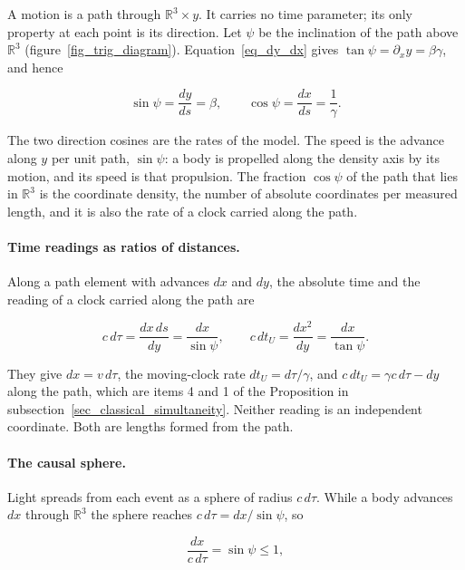 \documentclass{iopjournal}
\begin{document}
A motion is a path through $\mathbb{R}^3\times y$. It carries no time parameter; its only property at each point is its direction. Let $\psi$ be the inclination of the path above $\mathbb{R}^3$ (figure~\ref{fig_trig_diagram}). Equation~\eqref{eq_dy_dx} gives $\tan\psi=\partial_x y=\beta\gamma$, and hence

\begin{equation}\label{eq_path_angle}
    \sin\psi=\frac{dy}{ds}=\beta,
    \qquad
    \cos\psi=\frac{dx}{ds}=\frac{1}{\gamma}.
\end{equation}

The two direction cosines are the rates of the model. The speed is the advance along $y$ per unit path, $\sin\psi$: a body is propelled along the density axis by its motion, and its speed is that propulsion. The fraction $\cos\psi$ of the path that lies in $\mathbb{R}^3$ is the coordinate density, the number of absolute coordinates per measured length, and it is also the rate of a clock carried along the path.

\paragraph{Time readings as ratios of distances.} Along a path element with advances $dx$ and $dy$, the absolute time and the reading of a clock carried along the path are

\begin{equation}\label{eq_path_times}
    c\,d\tau=\frac{dx\,ds}{dy}=\frac{dx}{\sin\psi},
    \qquad
    c\,dt_U=\frac{dx^2}{dy}=\frac{dx}{\tan\psi}.
\end{equation}

They give $dx=v\,d\tau$, the moving-clock rate $dt_U=d\tau/\gamma$, and $c\,dt_U=\gamma c\,d\tau-dy$ along the path, which are items 4 and 1 of the Proposition in subsection~\ref{sec_classical_simultaneity}. Neither reading is an independent coordinate. Both are lengths formed from the path.

\paragraph{The causal sphere.} Light spreads from each event as a sphere of radius $c\,d\tau$. While a body advances $dx$ through $\mathbb{R}^3$ the sphere reaches $c\,d\tau=dx/\sin\psi$, so

\begin{equation}\label{eq_causal_sphere}
    \frac{dx}{c\,d\tau}=\sin\psi\leq1 ,
\end{equation}
\end{document}
